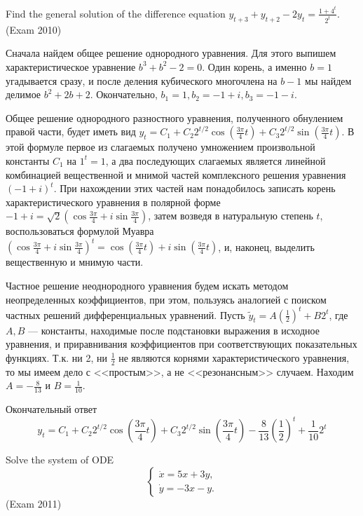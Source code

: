 \begin{problem}
Find the general solution of the difference equation $y_{t+3} +y_{t+2} -2y_{t} =\frac{1+4^{t} }{2^{t} } $. (Exam 2010)
\end{problem}

\begin{solution}
Сначала найдем общее решение однородного уравнения. Для этого выпишем характеристическое уравнение $b^{3} +b^{2} -2=0$. Один корень, а именно $b=1$ угадывается сразу, и после деления кубического многочлена на $b-1$ мы найдем делимое $b^{2} +2b+2$. Окончательно, $b_{1} =1, b_{2} =-1+i, b_{3} =-1-i$. 

Общее решение однородного разностного уравнения, полученного обнулением правой части, будет иметь вид $y_{t} =C_{1} +C_{2} 2^{t/2} \cos \left(\frac{3\pi }{4} t\right)+C_{3} 2^{t/2} \sin \left(\frac{3\pi }{4} t \right)$. В этой формуле первое из слагаемых получено умножением произвольной константы $C_{1} $ на $1^{t} =1$, а два последующих слагаемых является линейной комбинацией вещественной и мнимой частей комплексного решения уравнения $(-1+i)^{t} $. При нахождении этих частей нам понадобилось записать корень характеристического уравнения в полярной форме $-1+i=\sqrt{2} \left(\cos \frac{3\pi }{4} +i\sin \frac{3\pi }{4} \right)$, затем возведя в натуральную степень $t$, воспользоваться формулой Муавра $\left(\cos \frac{3\pi }{4} +i\sin \frac{3\pi }{4} \right)^{t} =\cos \left(\frac{3\pi }{4} t \right)+i\sin \left(\frac{3\pi }{4} t \right)$, и, наконец, выделить вещественную и мнимую части.

Частное решение неоднородного уравнения будем искать методом неопределенных коэффициентов, при этом, пользуясь аналогией с поиском частных решений дифференциальных уравнений. Пусть $\tilde{y}_{t} =A \left(\frac{1}{2} \right)^{t} +B2^{t} $, где $A, B$ --- константы, находимые после подстановки выражения в исходное уравнения, и приравнивания коэффициентов при соответствующих показательных функциях. Т.к. ни 2, ни $\frac{1}{2} $ не являются корнями характеристического уравнения, то мы имеем дело с <<простым>>, а не <<резонансным>> случаем. Находим $A=-\frac{8}{13} $ и $B=\frac{1}{10} $.

Окончательный ответ 
\[
y_{t} =C_{1} +C_{2} 2^{t/2} \cos \left(\frac{3\pi }{4} t \right)+
C_{3} 2^{t/2} \sin \left(\frac{3\pi }{4} t \right)-\frac{8}{13} \left(\frac{1}{2} \right)^{t} +\frac{1}{10} 2^{t} 
\]
\end{solution}


\begin{problem}
Solve the system of ODE  
\[
\begin{cases} 
\dot{x}=5x+3y, \\ 
\dot{y}=-3x-y.
\end{cases} 
\]
(Exam 2011)
\end{problem}

